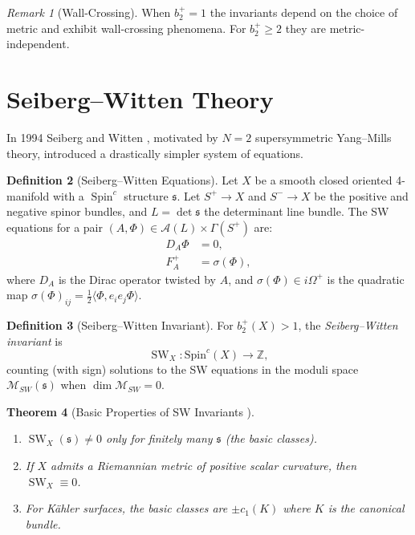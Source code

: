 \documentclass[12pt,a4paper]{amsart}
\newtheorem{theorem}{Theorem}[section]
\theoremstyle{definition}
\newtheorem{definition}[theorem]{Definition}
\theoremstyle{remark}
\newtheorem{remark}[theorem]{Remark}
\DeclareMathOperator{\SW}{SW}
\DeclareMathOperator{\Spin}{Spin}
\newcommand{\ZZ}{\mathbb{Z}}
\begin{document}
\begin{remark}[Wall-Crossing]
When $b_2^+ = 1$ the invariants depend on the choice of metric and exhibit
wall-crossing phenomena.  For $b_2^+ \ge 2$ they are metric-independent.
\end{remark}

\section{Seiberg--Witten Theory}

In 1994 Seiberg and Witten \cite{SeibergWitten1994}, motivated by
$N=2$ supersymmetric Yang--Mills theory, introduced a drastically simpler
system of equations.

\begin{definition}[Seiberg--Witten Equations]
Let $X$ be a smooth closed oriented 4-manifold with a $\Spin^c$ structure
$\mathfrak{s}$.  Let $S^+ \to X$ and $S^- \to X$ be the positive and
negative spinor bundles, and $L = \det \mathfrak{s}$ the determinant line
bundle.  The SW equations for a pair $(A, \Phi) \in \mathcal{A}(L) \times
\Gamma(S^+)$ are:
\begin{align}
  D_A \Phi &= 0, \label{eq:SW1}\\
  F_A^+ &= \sigma(\Phi), \label{eq:SW2}
\end{align}
where $D_A$ is the Dirac operator twisted by $A$, and $\sigma(\Phi) \in
i\Omega^+$ is the quadratic map $\sigma(\Phi)_{ij} = \tfrac{1}{2}\langle
\Phi, e_i e_j \Phi\rangle$.
\end{definition}

\begin{definition}[Seiberg--Witten Invariant]
For $b_2^+(X) > 1$, the \emph{Seiberg--Witten invariant} is
\[
  \SW_X \colon \mathrm{Spin}^c(X) \longrightarrow \ZZ,
\]
counting (with sign) solutions to the SW equations in the moduli space
$\mathcal{M}_{SW}(\mathfrak{s})$ when $\dim \mathcal{M}_{SW} = 0$.
\end{definition}

\begin{theorem}[Basic Properties of SW Invariants \cite{Witten1994SW}]
\begin{enumerate}[label=(\roman*)]
  \item $\SW_X(\mathfrak{s}) \neq 0$ only for finitely many $\mathfrak{s}$
        (the \emph{basic classes}).
  \item If $X$ admits a Riemannian metric of positive scalar curvature,
        then $\SW_X \equiv 0$.
  \item For Kähler surfaces, the basic classes are $\pm c_1(K)$ where $K$
        is the canonical bundle.
\end{enumerate}
\end{theorem}
\end{document}
